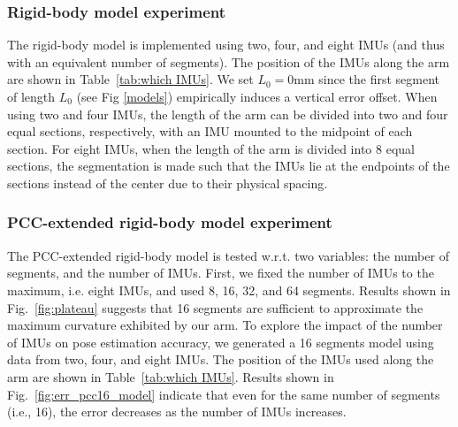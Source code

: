 \subsubsection{Rigid-body model experiment}
The rigid-body model is implemented using two, four, and eight IMUs (and thus with an equivalent number of segments). The position of the IMUs along the arm are shown in Table~\ref{tab:which IMUs}.
We set $L_0 = 0$mm since the first segment of length $L_0$ (see Fig \ref{models}) empirically induces a vertical error offset. 
When using two and four IMUs, the length of the arm can be divided into two and four equal sections, respectively, with an IMU mounted to the midpoint of each section.
For eight IMUs, when the length of the arm is divided into 8 equal sections, the segmentation is made such that the IMUs lie at the endpoints of the sections instead of the center due to their physical spacing.

\subsubsection{PCC-extended rigid-body model experiment}

The PCC-extended rigid-body model is tested w.r.t. two variables: the number of segments, and the number of IMUs.
First, we fixed the number of IMUs to the maximum, i.e. eight IMUs, and used 8, 16, 32, and 64 segments. 
Results shown in Fig.~\ref{fig:plateau} suggests that 16 segments are sufficient to approximate the maximum curvature exhibited by our arm.
To explore the impact of the number of IMUs on pose estimation accuracy, we generated a 16 segments model using data from two, four, and eight IMUs.
The position of the IMUs used along the arm are shown in Table~\ref{tab:which IMUs}. Results shown in Fig.~\ref{fig:err_pcc16_model} indicate that even for the same number of segments (i.e., 16), the error decreases as the number of IMUs increases.

